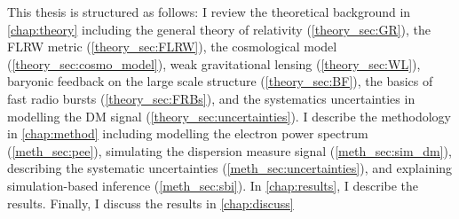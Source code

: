 This thesis is structured as follows: I review the theoretical background in \ref{chap:theory} including the general theory of relativity (\ref{theory_sec:GR}), the FLRW metric (\ref{theory_sec:FLRW}), the cosmological model (\ref{theory_sec:cosmo_model}), weak gravitational lensing (\ref{theory_sec:WL}), baryonic feedback on the large scale structure (\ref{theory_sec:BF}), the basics of fast radio bursts (\ref{theory_sec:FRBs}), and the systematics uncertainties in modelling the DM signal (\ref{theory_sec:uncertainties}). I describe the methodology in \ref{chap:method} including modelling the electron power spectrum (\ref{meth_sec:pee}), simulating the dispersion measure signal (\ref{meth_sec:sim_dm}), describing the systematic uncertainties (\ref{meth_sec:uncertainties}), and explaining simulation-based inference (\ref{meth_sec:sbi}). In \ref{chap:results}, I describe the results. Finally, I discuss the results in \ref{chap:discuss}
